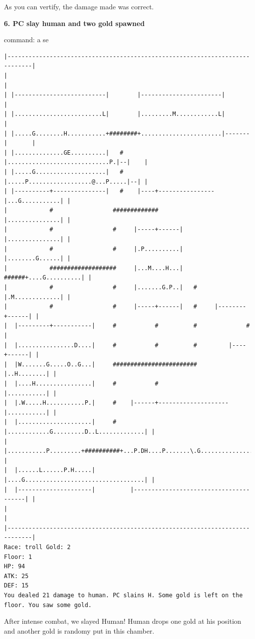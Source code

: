 \documentclass[11pt]{article}
\theoremstyle{plain}
\begin{document}
As you can vertify, the damage made was correct.


\newpage
\textbf{6. PC slay human and two gold spawned}

command: a se
\begin{Verbatim}[fontsize=\scriptsize]
|-----------------------------------------------------------------------------|
|                                                                             |
| |--------------------------|        |-----------------------|               |
| |.........................L|        |.........M............L|               |
| |.....G........H...........+########+.......................|-------|       |
| |..............GE..........|   #    |.............................P.|--|    |
| |.....G....................|   #    |.....P..................@...P.....|--| |
| |----------+---------------|   #    |----+----------------|...G...........| |
|            #                 #############                |...............| |
|            #                 #     |-----+------|         |...............| |
|            #                 #     |.P..........|         |........G......| |
|            ###################     |...M....H...|   ######+....G..........| |
|            #                 #     |.......G.P..|   #     |.M.............| |
|            #                 #     |-----+------|   #     |--------+------| |
|  |---------+-----------|     #           #          #              #        |
|  |................D....|     #           #          #         |----+------| |
|  |W.......G.....O..G...|     ########################         |..H........| |
|  |....H................|     #           #                    |...........| |
|  |.W.....H...........P.|     #    |------+--------------------|...........| |
|  |.....................|     #    |............G.........D..L.............| |
|  |...........P.........+##########+...P.DH....P.......\.G................W| |
|  |......L......P.H.....|          |....G..................................| |
|  |---------------------|          |---------------------------------------| |
|                                                                             |
|-----------------------------------------------------------------------------|
Race: troll Gold: 2                                                    Floor: 1
HP: 94
ATK: 25
DEF: 15
You dealed 21 damage to human. PC slains H. Some gold is left on the floor. You saw some gold. 
\end{Verbatim}

After intense combat, we slayed Human! Human drops one gold at his position
and another gold is randomy put in this chamber.
\end{document}
